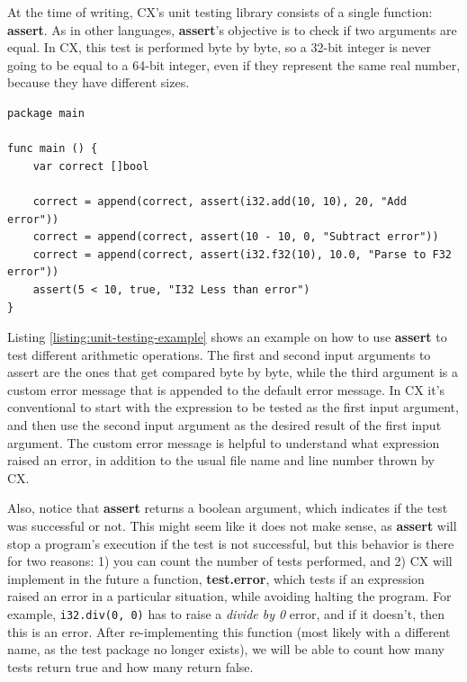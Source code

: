 \documentclass[11pt,fleqn,openany]{book} %
\begin{document}
At the time of writing, CX's unit testing library consists of a single function: \textbf{assert}. As in other languages, \textbf{assert}'s objective is to check if two arguments are equal. In CX, this test is performed byte by byte, so a 32-bit integer is never going to be equal to a 64-bit integer, even if they represent the same real number, because they have different sizes.

\begin{lstlisting}[caption={Testing with assert},captionpos=b,label={listing:unit-testing-example}]
package main

func main () {
	var correct []bool

	correct = append(correct, assert(i32.add(10, 10), 20, "Add error"))
	correct = append(correct, assert(10 - 10, 0, "Subtract error"))
	correct = append(correct, assert(i32.f32(10), 10.0, "Parse to F32 error"))
	assert(5 < 10, true, "I32 Less than error")
}
\end{lstlisting}

Listing \ref{listing:unit-testing-example} shows an example on how to use \textbf{assert} to test different arithmetic operations. The first and second input arguments to assert are the ones that get compared byte by byte, while the third argument is a custom error message that is appended to the default error message. In CX it's conventional to start with the expression to be tested as the first input argument, and then use the second input argument as the desired result of the first input argument. The custom error message is helpful to understand what expression raised an error, in addition to the usual file name and line number thrown by CX.

Also, notice that \textbf{assert} returns a boolean argument, which indicates if the test was successful or not. This might seem like it does not make sense, as \textbf{assert} will stop a program's execution if the test is not successful, but this behavior is there for two reasons: 1) you can count the number of tests performed, and 2) CX will implement in the future a function, \textbf{test.error}, which tests if an expression raised an error in a particular situation, while avoiding halting the program. For example, \lstinline{i32.div(0, 0)} has to raise a \emph{divide by 0} error, and if it doesn't, then this is an error. After re-implementing this function (most likely with a different name, as the test package no longer exists), we will be able to count how many tests return true and how many return false.
\end{document}
